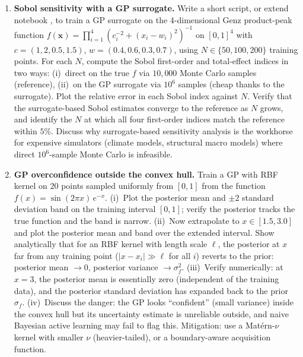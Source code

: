 \documentclass[11pt,a4paper]{report}
\begin{document}
\begin{enumerate}[itemsep=4pt, leftmargin=*]
\item\label{ex:ch9:6} \textbf{Sobol sensitivity with a GP surrogate.}  Write a short script, or extend notebook , to train a GP surrogate on the $4$-dimensional Genz product-peak function $f(\bm x) = \prod_{i=1}^{4}(c_i^{-2} + (x_i - w_i)^2)^{-1}$ on $[0,1]^4$ with $c = (1, 2, 0.5, 1.5)$, $w = (0.4, 0.6, 0.3, 0.7)$, using $N \in \{50, 100, 200\}$ training points.  For each $N$, compute the Sobol first-order and total-effect indices in two ways: (i)~direct on the true $f$ via $10{,}000$ Monte Carlo samples (reference), (ii)~on the GP surrogate via $10^6$ samples (cheap thanks to the surrogate).  Plot the relative error in each Sobol index against $N$.  Verify that the surrogate-based Sobol estimates converge to the reference as $N$ grows, and identify the $N$ at which all four first-order indices match the reference within $5\%$.  Discuss why surrogate-based sensitivity analysis is the workhorse for expensive simulators (climate models, structural macro models) where direct $10^6$-sample Monte Carlo is infeasible.
\item\label{ex:ch9:7} \textbf{GP overconfidence outside the convex hull.}  Train a GP with RBF kernel on $20$ points sampled uniformly from $[0, 1]$ from the function $f(x) = \sin(2\pi x)\,e^{-x}$.  (i)~Plot the posterior mean and $\pm 2$ standard deviation band on the training interval $[0,1]$; verify the posterior tracks the true function and the band is narrow.  (ii)~Now extrapolate to $x \in [1.5, 3.0]$ and plot the posterior mean and band over the extended interval.  Show analytically that for an RBF kernel with length scale $\ell$, the posterior at $x$ far from any training point ($|x - x_i| \gg \ell$ for all $i$) reverts to the prior: posterior mean $\to 0$, posterior variance $\to \sigma_f^2$.  (iii)~Verify numerically: at $x = 3$, the posterior mean is essentially zero (independent of the training data), and the posterior standard deviation has expanded back to the prior $\sigma_f$.  (iv)~Discuss the danger: the GP looks ``confident'' (small variance) inside the convex hull but its uncertainty estimate is unreliable outside, and naive Bayesian active learning may fail to flag this.  Mitigation: use a Mat\'ern-$\nu$ kernel with smaller $\nu$ (heavier-tailed), or a boundary-aware acquisition function.
\end{enumerate}

\end{document}
